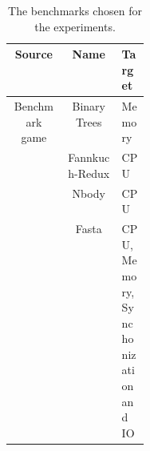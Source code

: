 \begin{table}[ht]
    \centering
    \begin{tabular}{||c | c | p{0.2\linewidth}||}
    \hline
    \textbf{Source} & \textbf{Name} & \textbf{Target} \\[0.5ex] \hline\hline
    Benchmark game & Binary Trees & Memory \\
    & Fannkuch-Redux & CPU \\
    & Nbody & CPU \\
    & Fasta & CPU, Memory, Synchonization and IO \\
    \hline
    \end{tabular}
    \caption{The benchmarks chosen for the experiments.}
    \label{tab:benchmarks}
\end{table}